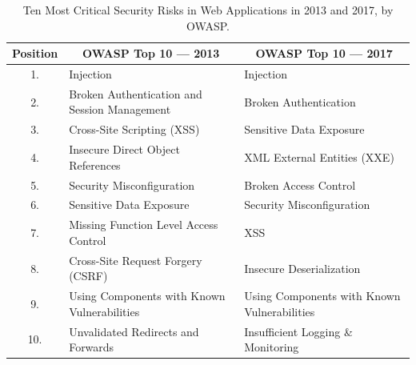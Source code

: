\documentclass{article} %
\begin{document}
\begin{table}[ht]
\hspace*{-1.75cm}
\centering
    \begin{tabular}{ | c | l | l |}
    \hline
    \multicolumn{1}{|c|}{\textbf{Position}} & \multicolumn{1}{c|}{\textbf{OWASP\index{The Open Web Application Security Project (OWASP)} Top 10 --- 2013}} & \multicolumn{1}{c|}{\textbf{OWASP\index{The Open Web Application Security Project (OWASP)} Top 10 --- 2017}} \\ \hline
    1. & Injection & Injection \\ \hline
    2. & Broken Authentication and Session Management & Broken Authentication \\ \hline
    3. & Cross-Site Scripting (XSS)\index{Cross-Site Scripting (XSS)} & Sensitive Data Exposure \\ \hline
    4. & Insecure Direct Object References & XML External Entities (XXE)\index{XML External Entities (XXE)} \\ \hline
    5. & Security Misconfiguration\index{Security!misconfiguration} & Broken Access Control \\ \hline
    6. & Sensitive Data Exposure & Security Misconfiguration\index{Security!misconfiguration} \\ \hline
    7. & Missing Function Level Access Control & XSS\index{Cross-Site Scripting (XSS)} \\ \hline
    8. & Cross-Site Request Forgery (CSRF)\index{Cross-Site Request Forgery (CSRF)} & Insecure Deserialization \\ \hline
    9. & Using Components with Known Vulnerabilities\index{Vulnerabilities!Known Vulnerabilities} & Using Components with Known Vulnerabilities\index{Vulnerabilities!Known Vulnerabilities} \\ \hline
    10. & Unvalidated\index{Validation} Redirects and Forwards & Insufficient Logging \& Monitoring \\ \hline
    \end{tabular}
\caption{Ten Most Critical Security Risks in Web Applications in 2013 and 2017, by OWASP.}
\label{tab:owasp_risks}
\hspace*{-2.25cm}
\end{table}\\
\end{document}
